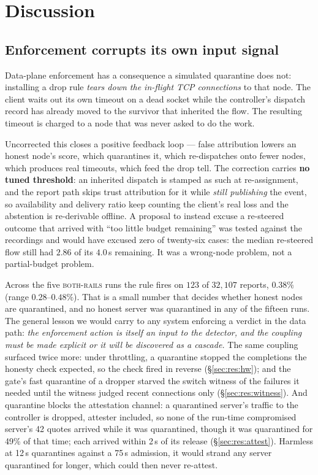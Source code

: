 \documentclass[10pt,twocolumn,letterpaper]{article}
\newcommand{\armfull}{\textsc{both-rails}}
\begin{document}
\section{Discussion}
\label{sec:discussion}

\subsection{Enforcement corrupts its own input signal}
\label{sec:disc:feedback}
Data-plane enforcement has a consequence a simulated quarantine does not:
installing a drop rule \emph{tears down the in-flight TCP connections} to that
node. The client waits out its own timeout on a dead socket while the
controller's dispatch record has already moved to the survivor that inherited
the flow. The resulting timeout is charged to a node that was never asked to do
the work.

Uncorrected this closes a positive feedback loop --- false attribution lowers an
honest node's score, which quarantines it, which re-dispatches onto fewer
nodes, which produces real timeouts, which feed the drop tell. The correction
carries \textbf{no tuned threshold}: an inherited dispatch is stamped as such
at re-assignment, and the report path skips trust attribution for it while
\emph{still publishing} the event, so availability and delivery ratio keep
counting the client's real loss and the abstention is re-derivable offline. A
proposal to instead excuse a re-steered outcome that arrived with ``too little
budget remaining'' was tested against the recordings and would have excused
zero of twenty-six cases: the median re-steered flow still had $2.86$ of its
$4.0$\,s remaining. It was a wrong-node problem, not a partial-budget problem.

Across the five \armfull{} runs the rule fires on $123$ of $32{,}107$ reports,
$0.38\%$ (range $0.28$--$0.48\%$).  That is a small number
that decides whether honest nodes are quarantined, and no honest server was
quarantined in any of the fifteen runs. The general lesson we would carry to
any system enforcing a verdict in the data path: \emph{the enforcement action
is itself an input to the detector, and the coupling must be made explicit or
it will be discovered as a cascade.} The same coupling surfaced twice more:
under throttling, a quarantine stopped the completions the honesty check
expected, so the check fired in reverse (\S\ref{sec:res:hw}); and the gate's
fast quarantine of a dropper starved the switch witness of the failures it
needed until the witness judged recent connections only
(\S\ref{sec:res:witness}). And quarantine blocks the attestation channel: a
quarantined server's traffic to the controller is dropped, attester included,
so none of the run-time compromised server's 42 quotes arrived while it was
quarantined, though it was quarantined for 49\% of that time; each arrived
within 2\,s of its release (\S\ref{sec:res:attest}). Harmless at 12\,s
quarantines against a 75\,s admission, it would strand any server quarantined
for longer, which could then never re-attest.
\end{document}
